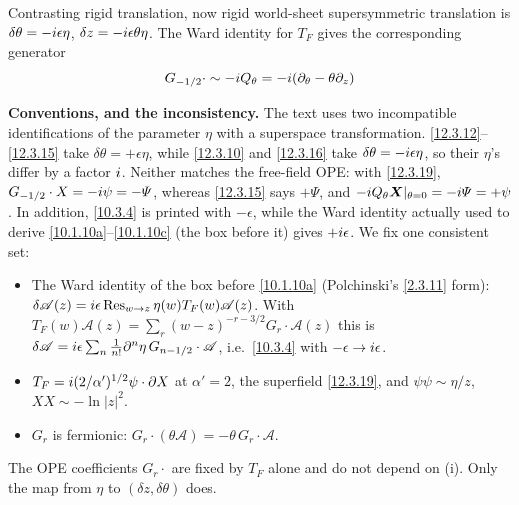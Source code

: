 Contrasting rigid translation, now rigid world-sheet supersymmetric translation is $\delta\theta ={-}i\epsilon\eta$, $\delta z={-}i\epsilon\theta\eta$. The Ward identity for $T_{F}$ gives the corresponding generator
\begin{equation}
	G_{{-}1/2}\cdot \sim -i Q_{\theta} = -i(\partial_{\theta}-\theta\partial_{z}) \label{12.3.16}
\end{equation}
\begin{tcolorbox}[breakable]
	\begin{remark}
		\textbf{Conventions, and the inconsistency.} The text uses two incompatible identifications of the parameter $\eta$ with a superspace transformation. \eqref{12.3.12}--\eqref{12.3.15} take $\delta\theta=+\epsilon\eta$, while \eqref{12.3.10} and \eqref{12.3.16} take $\delta\theta=-i\epsilon\eta$, so their $\eta$'s differ by a factor $i$. Neither matches the free-field OPE: with \eqref{12.3.19}, $G_{-1/2}\cdot X=-i\psi=-\varPsi$, whereas \eqref{12.3.15} says $+\varPsi$, and $-i Q_{\theta}\bm X|_{\theta=0}=-i\varPsi=+\psi$. In addition, \eqref{10.3.4} is printed with $-\epsilon$, while the Ward identity actually used to derive \eqref{10.1.10a}--\eqref{10.1.10c} (the box before it) gives $+i\epsilon$. We fix one consistent set:
		\begin{itemize}
			\item[(i)] The Ward identity of the box before \eqref{10.1.10a} (Polchinski's \eqref{2.3.11} form): $\delta\mathscr A(z)=i\epsilon\operatorname{Res}_{w\to z}\eta(w)T_{F}(w)\mathscr A(z)$. With $T_{F}(w)\mathscr A(z)=\sum_{r}(w-z)^{-r-3/2}G_{r}\cdot\mathscr A(z)$ this is $\delta\mathscr A=i\epsilon\sum_{n}\frac{1}{n!}\partial^{n}\eta\,G_{n-1/2}\cdot\mathscr A$, i.e.\ \eqref{10.3.4} with $-\epsilon\to i\epsilon$.
			\item[(ii)] $T_{F}=i(2/\alpha')^{1/2}\psi\cdot\partial X$ at $\alpha'=2$, the superfield \eqref{12.3.19}, and $\psi\psi\sim\eta/z$, $XX\sim-\ln\lvert z\rvert^{2}$.
			\item[(iii)] $G_{r}$ is fermionic: $G_{r}\cdot(\theta\mathscr A)=-\theta\,G_{r}\cdot\mathscr A$.
		\end{itemize}
		The OPE coefficients $G_{r}\cdot$ are fixed by $T_{F}$ alone and do not depend on (i). Only the map from $\eta$ to $(\delta z,\delta\theta)$ does.


\end{remark}
\end{tcolorbox}
